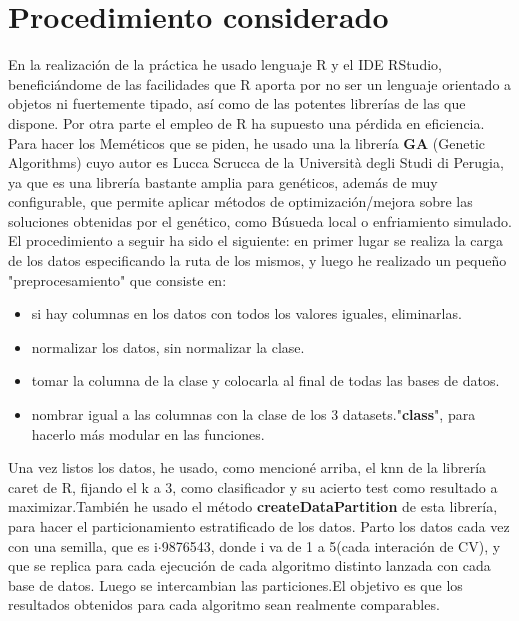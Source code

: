 \documentclass[	DIV=calc,%
							paper=a4,%
							fontsize=11pt,
							onecolumn]{scrartcl}	 					%
\begin{document}
\section*{Procedimiento considerado}
En la realización de la práctica he usado lenguaje R y el IDE RStudio,
beneficiándome de las facilidades que R aporta por no ser un lenguaje orientado a objetos ni fuertemente tipado, así como de las potentes librerías de las que dispone. Por otra parte el empleo de R ha supuesto una pérdida en eficiencia. \newline
\newline
Para hacer los Meméticos que se piden, he usado una la librería \textbf{GA} (Genetic Algorithms) cuyo autor es Lucca Scrucca de la Università degli Studi di Perugia, ya que es una librería bastante amplia para genéticos, además de muy configurable, que permite aplicar métodos de optimización/mejora sobre las soluciones obtenidas por el genético, como Búsueda local o enfriamiento simulado.\newline
\newline
El procedimiento a seguir ha sido el siguiente: en primer lugar se realiza la carga de los datos especificando la ruta de los mismos, y luego he realizado un pequeño "preprocesamiento" que consiste en:

\begin{itemize}
\item si hay columnas en los datos con todos los valores iguales, eliminarlas.
\item normalizar los datos, sin normalizar la clase.
\item tomar la columna de la clase y colocarla al final de todas las bases de datos.
\item nombrar igual a las columnas con la clase de los 3 datasets."\textbf{class}", para hacerlo más modular en las funciones. 
\end{itemize}

Una vez listos los datos, he usado, como mencioné arriba, el knn de la librería caret de R, fijando el k a 3, como clasificador y su acierto test como resultado a maximizar.\newline También he usado el método \textbf{createDataPartition} de esta librería, para hacer el particionamiento estratificado de los datos. Parto los datos cada vez con una semilla, que es i$\cdot$9876543, donde i va de 1 a 5(cada interación de CV), y que se replica para cada ejecución de cada algoritmo distinto lanzada con cada base de datos. Luego se intercambian las particiones.\newline El objetivo es que los resultados obtenidos para cada algoritmo sean realmente comparables.\newline
\newline
\end{document}
